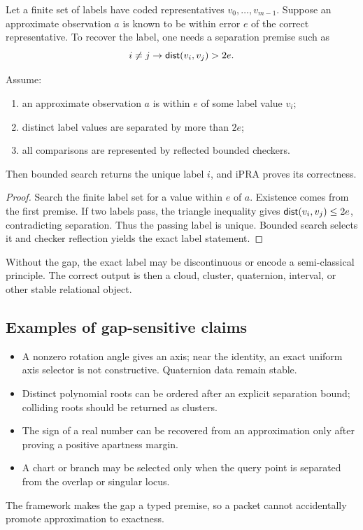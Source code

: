 Let a finite set of labels have coded representatives
\(v_0,\ldots,v_{m-1}\).  Suppose an approximate observation \(a\) is known to
be within error \(e\) of the correct representative.  To recover the label,
one needs a separation premise such as
\[
  i\ne j\to \mathsf{dist}(v_i,v_j)>2e.
\]

\begin{theorem}\label{thm:gap-recovery}
Assume:
\begin{enumerate}
\item an approximate observation \(a\) is within \(e\) of some label value
\(v_i\);
\item distinct label values are separated by more than \(2e\);
\item all comparisons are represented by reflected bounded checkers.
\end{enumerate}
Then bounded search returns the unique label \(i\), and iPRA proves its
correctness.
\end{theorem}

\begin{proof}
Search the finite label set for a value within \(e\) of \(a\).  Existence comes
from the first premise.  If two labels pass, the triangle inequality gives
\(\mathsf{dist}(v_i,v_j)\le2e\), contradicting separation.  Thus the passing label is
unique.  Bounded search selects it and checker reflection yields the exact
label statement.
\end{proof}

Without the gap, the exact label may be discontinuous or encode a
semi-classical principle.  The correct output is then a cloud, cluster,
quaternion, interval, or other stable relational object.

\subsection{Examples of gap-sensitive claims}

\begin{itemize}
\item A nonzero rotation angle gives an axis; near the identity, an exact
uniform axis selector is not constructive.  Quaternion data remain stable.
\item Distinct polynomial roots can be ordered after an explicit separation
bound; colliding roots should be returned as clusters.
\item The sign of a real number can be recovered from an approximation only
after proving a positive apartness margin.
\item A chart or branch may be selected only when the query point is separated
from the overlap or singular locus.
\end{itemize}

The framework makes the gap a typed premise, so a packet cannot accidentally
promote approximation to exactness.
